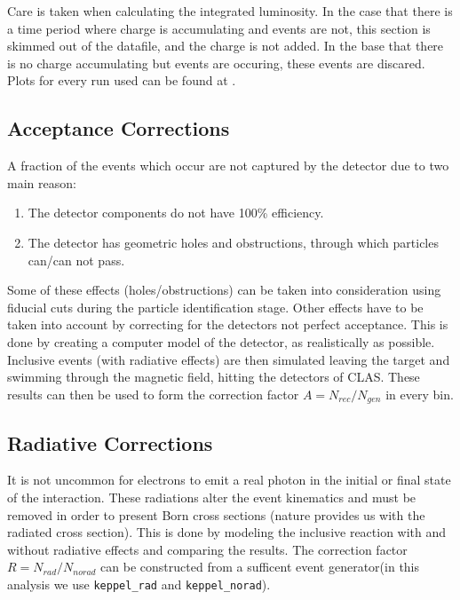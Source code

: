 Care is taken when calculating the integrated luminosity.  In the case that there is a time period where charge is accumulating and events are not, this section is skimmed out of the datafile, and the charge is not added.  In the base that there is no charge accumulating but events are occuring, these events are discared.  Plots for every run used can be found at \cite{fcup-website}.


\subsection{Acceptance Corrections}
A fraction of the events which occur are not captured by the detector due to two main reason: 

\begin{enumerate}
  \item The detector components do not have 100\% efficiency.
  \item The detector has geometric holes and obstructions, through which particles can/can not pass.
\end{enumerate}

Some of these effects (holes/obstructions) can be taken into consideration using fiducial cuts during the particle identification stage.  Other effects  have to be taken into account by correcting for the detectors not perfect acceptance.  This is done by creating a computer model of the detector, as realistically as possible.  Inclusive events (with radiative effects) are then simulated leaving the target and swimming through the magnetic field, hitting the detectors of CLAS.  These results can then be used to form the correction factor $A = N_{rec}/N_{gen}$ in every bin.  

\subsection{Radiative Corrections}
It is not uncommon for electrons to emit a real photon in the initial or final state of the interaction.  These radiations alter the event kinematics and must be removed in order to present Born cross sections (nature provides us with the radiated cross section).  This is done by modeling the inclusive reaction with and without radiative effects and comparing the results.  The correction factor $R = N_{rad}/N_{no rad}$ can be constructed from a sufficent event generator(in this analysis we use \texttt{keppel\_rad} and \texttt{keppel\_norad}).  

